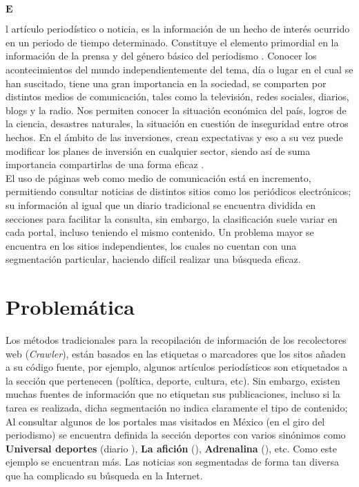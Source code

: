 	








\ \\\\
\begin{Large}$\mathbf{E}$\end{Large}l artículo periodístico o noticia, es la información de un hecho de interés 
  ocurrido en un periodo de tiempo determinado. Constituye el elemento primordial en la información de la prensa y 
  del género básico del periodismo \citep{CU1}. Conocer los acontecimientos del mundo independientemente del tema, día o 
  lugar en el cual se han suscitado, tiene una gran importancia en la sociedad, se comparten por distintos medios de comunicación, 
  tales como la televisión, redes sociales, diarios, blogs y la radio. Nos permiten conocer la situación económica del país, logros 
  de la ciencia, desastres naturales, la situación en cuestión de inseguridad entre otros hechos. En el ámbito de las inversiones, 
  crean expectativas y eso a su vez puede modificar los planes de inversión en cualquier sector, siendo así de suma importancia 
  compartirlas de una forma eficaz \citep{CU2}.\\

El uso de páginas web como medio de comunicación está en incremento, permitiendo consultar noticias de distintos sitios como 
los periódicos electrónicos; su información al igual que un diario tradicional se encuentra dividida en secciones para facilitar 
la consulta, sin embargo, la clasificación suele variar en cada portal, incluso teniendo el mismo contenido. Un problema mayor se 
encuentra en los sitios independientes, los cuales no cuentan con una segmentación particular, haciendo difícil realizar una búsqueda eficaz.\\


\section{Problemática}


Los métodos tradicionales para la recopilación de información de los recolectores web (\textit{Crawler}), están basados en las etiquetas o 
marcadores que los sitos añaden a su código fuente, por ejemplo, algunos artículos periodísticos son etiquetados a la sección que pertenecen 
(política, deporte, cultura, etc). Sin embargo, existen muchas fuentes de información que no etiquetan sus publicaciones, incluso si la tarea 
es realizada, dicha segmentación no indica claramente el tipo de contenido; Al consultar algunos de los portales mas visitados en México (en el giro del periodismo) 
se encuentra definida la sección deportes con varios sinónimos como \textbf{Universal deportes} (diario ), \textbf{La afición} 
(), \textbf{Adrenalina} (), etc. Como este ejemplo se encuentran más. Las noticias son segmentadas de forma tan diversa que 
ha complicado su búsqueda en la Internet.\\


